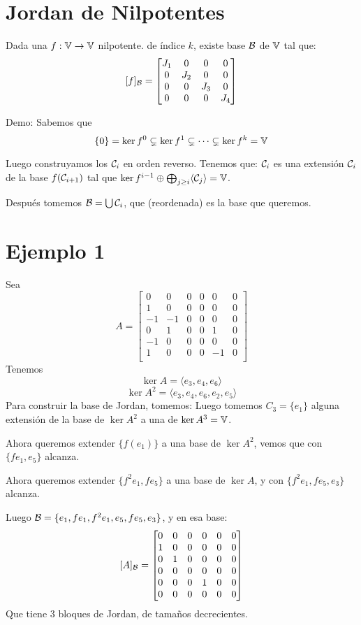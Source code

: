 \documentclass{article}
\begin{document}
\section*{Jordan de Nilpotentes}
Dada una $f : \mathbb{V} \to \mathbb{V}$ nilpotente. de índice $k$, existe base $\mathcal{B}$ de $\mathbb{V}$ tal que:
\[
	[f]_{\mathcal{B}} =
	\begin{bmatrix}
		J_1 & 0 & 0 & 0 \\
		0 & J_2 & 0 & 0 \\
		0 & 0 & J_3 & 0 \\
		0 & 0 & 0 & J_4 \\
	\end{bmatrix}
\]

Demo:
Sabemos que
\[\{0\} = \ker f^0 \subsetneq \ker f^1 \subsetneq \dots \subsetneq \ker f^k = \mathbb{V}\]

Luego construyamos los $\mathcal{C}_i$ en orden reverso. Tenemos que:
$\mathcal{C}_{i}$ es una extensión $\mathcal{C}_i$ de la base $f(\mathcal{C}_{i+1})$ tal que $\ker f^{i-1} \oplus \bigoplus_{j \geq i} \langle \mathcal{C}_j\rangle = \mathbb{V}$.

Después tomemos $\mathcal{B} = \bigcup \mathcal{C}_i$, que (reordenada) es la base que queremos.
\section*{Ejemplo 1}
Sea
\[
	A =
	\begin{bmatrix}
		0 & 0 & 0 & 0 & 0 & 0 \\
		1 & 0 & 0 & 0 & 0 & 0 \\
		-1 & -1 & 0 & 0 & 0 & 0 \\
		0 & 1 & 0 & 0 & 1 & 0 \\
		-1 & 0 & 0 & 0 & 0 & 0 \\
		1 & 0 & 0 & 0 & -1 & 0 \\
	\end{bmatrix}
\]
Tenemos
\[\ker A = \langle e_3, e_4, e_6 \rangle\]
\[\ker A^2 = \langle e_3, e_4, e_6, e_2, e_5 \rangle\]
Para construir la base de Jordan, tomemos:
Luego tomemos $C_3 = \{e_1\}$ alguna extensión de la base de $\ker A^2$ a una de $\ker A^3 = \mathbb{V}$.

Ahora queremos extender $\{f(e_1)\}$ a una base de $\ker A^2$, vemos que con $\{fe_1, e_5\}$ alcanza.

Ahora queremos extender $\{f^2e_1, fe_5\}$ a una base de $\ker A$, y con $\{f^2 e_1, fe_5, e_3\}$ alcanza.

Luego $\mathcal{B} = \{e_1, fe_1, f^2e_1, e_5, fe_5, e_3\}$, y en esa base:
\[
	[A]_{\mathcal{B}} =
	\begin{bmatrix}
		0 & 0 & 0 & 0 & 0 & 0 \\
		1 & 0 & 0 & 0 & 0 & 0 \\
		0 & 1 & 0 & 0 & 0 & 0 \\
		0 & 0 & 0 & 0 & 0 & 0 \\
		0 & 0 & 0 & 1 & 0 & 0 \\
		0 & 0 & 0 & 0 & 0 & 0 \\
	\end{bmatrix}
\]
Que tiene $3$ bloques de Jordan, de tamaños decrecientes.
\end{document}
